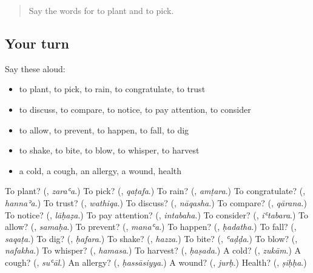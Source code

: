 \label{lesson:AR-R200-second-pass-words-from-chapters-196-200}



\begin{quote}
Say the words for to plant and to pick.
\end{quote}

\subsection*{Your turn}
Say these aloud:

\begin{itemize}
\raggedright
  \item to plant, to pick, to rain, to congratulate, to trust
  \item to discuss, to compare, to notice, to pay attention, to consider
  \item to allow, to prevent, to happen, to fall, to dig
  \item to shake, to bite, to blow, to whisper, to harvest
  \item a cold, a cough, an allergy, a wound, health
\end{itemize}

\begin{tcolorbox}[breakable,colback=teal!4,colframe=teal!35!black,title={Before you move on}]
To plant? (\textbf{}, \emph{zaraʿa}.) To pick? (\textbf{}, \emph{qaṭafa}.) To rain? (\textbf{}, \emph{amṭara}.) To congratulate? (\textbf{}, \emph{hannaʾa}.) To trust? (\textbf{}, \emph{wathiqa}.) To discuss? (\textbf{}, \emph{nāqasha}.) To compare? (\textbf{}, \emph{qārana}.) To notice? (\textbf{}, \emph{lāḥaẓa}.) To pay attention? (\textbf{}, \emph{intabaha}.) To consider? (\textbf{}, \emph{iʿtabara}.) To allow? (\textbf{}, \emph{samaḥa}.) To prevent? (\textbf{}, \emph{manaʿa}.) To happen? (\textbf{}, \emph{ḥadatha}.) To fall? (\textbf{}, \emph{saqaṭa}.) To dig? (\textbf{}, \emph{ḥafara}.) To shake? (\textbf{}, \emph{hazza}.) To bite? (\textbf{}, \emph{ʿaḍḍa}.) To blow? (\textbf{}, \emph{nafakha}.) To whisper? (\textbf{}, \emph{hamasa}.) To harvest? (\textbf{}, \emph{ḥaṣada}.) A cold? (\textbf{}, \emph{zukām}.) A cough? (\textbf{}, \emph{suʿāl}.) An allergy? (\textbf{}, \emph{ḥassāsiyya}.) A wound? (\textbf{}, \emph{jurḥ}.) Health? (\textbf{}, \emph{ṣiḥḥa}.)
\end{tcolorbox}
